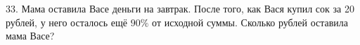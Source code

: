 33. Мама оставила Васе деньги на завтрак. После того, как Вася купил сок за 20 рублей, у него осталось ещё $90\%$ от исходной суммы. Сколько рублей оставила мама Васе?\\
